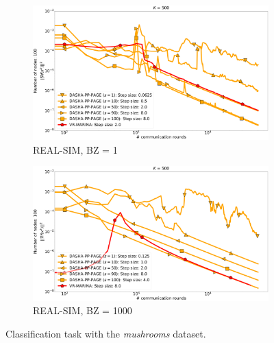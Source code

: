 \documentclass{article}
\begin{document}
\begin{figure}[h]
    \begin{subfigure}{.5\textwidth}
        \includegraphics[width=\textwidth]{neurips_2022_finite_sum_real-sim_nof_500_numnodes_100_more_probs_batch_size_1.pdf}
        \caption{REAL-SIM, BZ = 1}
    \end{subfigure}
    \begin{subfigure}{.5\textwidth}
        \includegraphics[width=\textwidth]{neurips_2022_finite_sum_real-sim_nof_500_numnodes_100_more_probs_batch_size_1000.pdf}
        \caption{REAL-SIM, BZ = 1000}
    \end{subfigure}
\caption{Classification task with the \textit{mushrooms} dataset.}
\label{fig:finite-sum-real-sim}
\end{figure}

\clearpage
\end{document}
